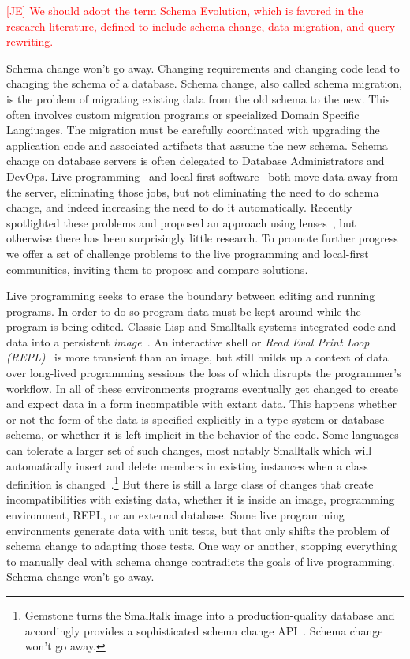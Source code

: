 \documentclass[english,submission]{programming}
\begin{document}
\textcolor{red}{[JE] We should adopt the term Schema Evolution, which is favored in the research literature, defined to include schema change, data migration, and query rewriting. }

Schema change won't go away. Changing requirements and changing code lead to changing the schema of a database. Schema change, also called schema migration, is the problem of migrating existing data from the old schema to the new. This often involves custom migration programs or specialized Domain Specific Langiuages. The migration must be carefully coordinated with upgrading the application code and associated artifacts that assume the new schema. Schema change on database servers is often delegated to Database Administrators and DevOps. Live programming~\cite{tanimoto90,Hancock03} and local-first software~\cite{localfirst} both move data away from the server, eliminating those jobs, but not eliminating the need to do schema change, and indeed increasing the need to do it automatically. Recently \citet{Cambria} spotlighted these problems and proposed an approach using lenses~\cite{Foster2007}, but otherwise there has been surprisingly little research. To promote further progress we offer a set of challenge problems to the live programming and local-first communities, inviting them to propose and compare solutions.

Live programming seeks to erase the boundary between editing and running programs. In order to do so program data must be kept around while the program is being edited. Classic Lisp and Smalltalk systems integrated code and data into a persistent \textit{image}~\cite{Sandewall78, Goldberg80}. An interactive shell or \textit{Read Eval Print Loop (REPL)}~\cite{Deutsch64} is more transient than an image, but still builds up a context of data over long-lived programming sessions the loss of which disrupts the programmer's workflow. In all of these environments programs eventually get changed to create and expect data in a form incompatible with extant data. This happens whether or not the form of the data is specified explicitly in a type system or database schema, or whether it is left implicit in the behavior of the code. Some languages can tolerate a larger set of such changes, most notably Smalltalk which will automatically insert and delete members in existing instances when a class definition is changed~\cite[pp.252-272]{Goldberg80}.\footnote{Gemstone turns the Smalltalk image into a production-quality database and accordingly provides a sophisticated schema change API~\cite{Gemstone}. Schema change won't go away.} But there is still a large class of changes that create incompatibilities with existing data, whether it is inside an image, programming environment, REPL, or an external database. Some live programming environments generate data with unit tests, but that only shifts the problem of schema change to adapting those tests. One way or another, stopping everything to manually deal with schema change contradicts the goals of live programming. Schema change won't go away.
\end{document}
